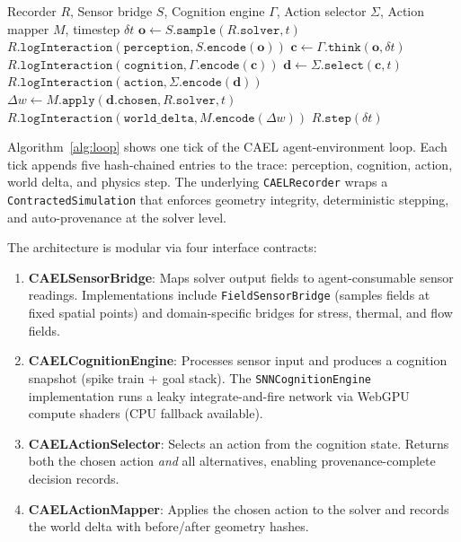 \documentclass[sigconf,nonacm]{acmart}
\begin{document}
\begin{algorithm}[t]
\caption{CAEL Agent-Environment Loop (one tick)}
\label{alg:loop}
\begin{algorithmic}[1]
\Require Recorder $R$, Sensor bridge $S$, Cognition engine $\Gamma$,
  Action selector $\Sigma$, Action mapper $M$, timestep $\delta t$
\State $\mathbf{o} \leftarrow S.\texttt{sample}(R.\texttt{solver}, t)$
\State $R.\texttt{logInteraction}(\texttt{perception}, S.\texttt{encode}(\mathbf{o}))$
\State $\mathbf{c} \leftarrow \Gamma.\texttt{think}(\mathbf{o}, \delta t)$
\State $R.\texttt{logInteraction}(\texttt{cognition}, \Gamma.\texttt{encode}(\mathbf{c}))$
\State $\mathbf{d} \leftarrow \Sigma.\texttt{select}(\mathbf{c}, t)$
\State $R.\texttt{logInteraction}(\texttt{action}, \Sigma.\texttt{encode}(\mathbf{d}))$
\State $\Delta w \leftarrow M.\texttt{apply}(\mathbf{d}.\texttt{chosen}, R.\texttt{solver}, t)$
\State $R.\texttt{logInteraction}(\texttt{world\_delta}, M.\texttt{encode}(\Delta w))$
\State $R.\texttt{step}(\delta t)$
\end{algorithmic}
\end{algorithm}

Algorithm~\ref{alg:loop} shows one tick of the CAEL agent-environment
loop. Each tick appends five hash-chained entries to the trace:
perception, cognition, action, world delta, and physics step. The
underlying \texttt{CAELRecorder} wraps a \texttt{ContractedSimulation}
that enforces geometry integrity, deterministic stepping, and
auto-provenance at the solver level.

The architecture is modular via four interface contracts:

\begin{enumerate}
  \item \textbf{CAELSensorBridge}: Maps solver output fields to
    agent-consumable sensor readings. Implementations include
    \texttt{FieldSensorBridge} (samples fields at fixed spatial
    points) and domain-specific bridges for stress, thermal, and
    flow fields.
  \item \textbf{CAELCognitionEngine}: Processes sensor input and
    produces a cognition snapshot (spike train + goal stack).
    The \texttt{SNNCognitionEngine} implementation runs a
    leaky integrate-and-fire network via WebGPU compute shaders
    (CPU fallback available).
  \item \textbf{CAELActionSelector}: Selects an action from the
    cognition state. Returns both the chosen action \emph{and}
    all alternatives, enabling provenance-complete decision records.
  \item \textbf{CAELActionMapper}: Applies the chosen action to
    the solver and records the world delta with before/after
    geometry hashes.
\end{enumerate}
\end{document}
